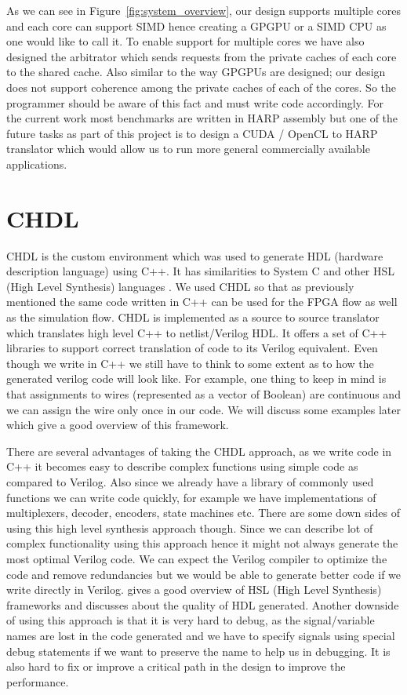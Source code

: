 As we can see in Figure~\ref{fig:system_overview}, our design supports multiple cores and each core can support SIMD hence creating a GPGPU or a SIMD CPU as one would like to call it. To enable support for multiple cores we have also designed the arbitrator which sends requests from the private caches of each core to the shared cache. Also similar to the way GPGPUs are designed; our design does not support coherence among the private caches of each of the cores. So the programmer should be aware of this fact and must write code accordingly. For the current work most benchmarks are written in HARP assembly but one of the future tasks as part of this project is to design a CUDA / OpenCL to HARP translator which would allow us to run more general commercially available applications.
\section{ CHDL }
CHDL is the custom environment which was used to generate HDL (hardware description language) using C++. It has similarities to System C and other HSL (High Level Synthesis) languages \cite{hls_overview}. We used CHDL so that as previously mentioned the same code written in C++ can be used for the FPGA flow as well as the simulation flow. CHDL is implemented as a source to source translator which translates high level C++ to netlist/Verilog HDL. It offers a set of C++ libraries to support correct translation of code to its Verilog equivalent. Even though we write in C++ we still have to think to some extent as to how the generated verilog code will look like. For example, one thing to keep in mind is that assignments to wires (represented as a vector of Boolean) are continuous and we can assign the wire only once in our code. We will discuss some examples later which give a good overview of this framework.

There are several advantages of taking the CHDL approach, as we write code in C++ it becomes easy to describe complex functions using simple code as compared to Verilog. Also since we already have a library of commonly used functions we can write code quickly, for example we have implementations of multiplexers, decoder, encoders, state machines etc. There are some down sides of using this high level synthesis approach though. Since we can describe lot of complex functionality using this approach hence it might not always generate the most optimal Verilog code. We can expect the Verilog compiler to optimize the code and remove redundancies but we would be able to generate better code if we write directly in Verilog. \cite{hls_overview} gives a good overview of HSL (High Level Synthesis) frameworks and discusses about the quality of HDL generated. Another downside of using this approach is that it is very hard to debug, as the signal/variable names are lost in the code generated and we have to specify signals using special debug statements if we want to preserve the name to help us in debugging. It is also hard to fix or improve a critical path in the design to improve the performance.%

